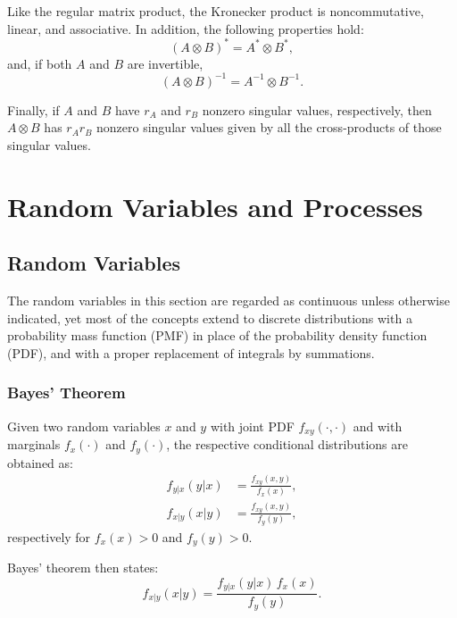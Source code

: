 Like the regular matrix product, the Kronecker product is noncommutative, linear, and associative.  
In addition, the following properties hold:
\begin{equation}
(A \otimes B)^{*} = A^{*} \otimes B^{*},
\tag{B.36}
\end{equation}
and, if both \(A\) and \(B\) are invertible,
\begin{equation}
(A \otimes B)^{-1} = A^{-1} \otimes B^{-1}.
\tag{B.37}
\end{equation}

Finally, if \(A\) and \(B\) have \(r_A\) and \(r_B\) nonzero singular values, respectively, then \(A \otimes B\) has \(r_A r_B\) nonzero singular values given by all the cross-products of those singular values.

\section{Random Variables and Processes}

\subsection{Random Variables}

The random variables in this section are regarded as continuous unless otherwise indicated, yet most of the concepts extend to discrete distributions with a probability mass function (PMF) in place of the probability density function (PDF), and with a proper replacement of integrals by summations.


\subsubsection{Bayes' Theorem}

Given two random variables \(x\) and \(y\) with joint PDF \( f_{xy}(\cdot, \cdot) \) and with marginals \( f_x(\cdot) \) and \( f_y(\cdot) \),  
the respective conditional distributions are obtained as:
\begin{align}
f_{y|x}(y|x) &= \frac{f_{xy}(x, y)}{f_x(x)}, \tag{C.1} \\
f_{x|y}(x|y) &= \frac{f_{xy}(x, y)}{f_y(y)}, \tag{C.2}
\end{align}
respectively for \( f_x(x) > 0 \) and \( f_y(y) > 0 \).

Bayes’ theorem then states:
\begin{equation}
f_{x|y}(x|y) = \frac{f_{y|x}(y|x) \, f_x(x)}{f_y(y)}.
\tag{C.3}
\end{equation}

